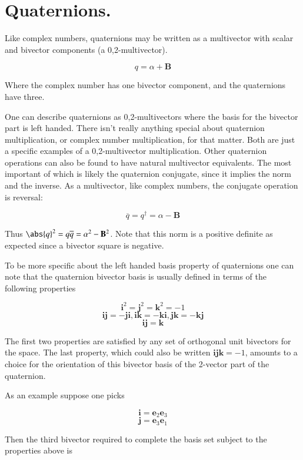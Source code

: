 \chapter{Quaternions.} %

Like complex numbers, quaternions may be written as a multivector with scalar and bivector components (a 0,2-multivector).

\[
q = \alpha + \mathbf{B}
\]

Where the complex number has one bivector component, and the quaternions have three.

One can describe quaternions as 0,2-multivectors where the basis for the bivector part is left handed.  There isn't really anything special about quaternion multiplication, or complex number multiplication, for that matter.  Both are just a specific examples of a 0,2-multivector multiplication.  Other quaternion operations can also be found to have natural multivector equivalents.  The most important of which is likely the quaternion conjugate, since it implies the norm and the inverse.  As a multivector, like complex numbers, the conjugate operation is reversal:

\[
\overline{q} = q^\dagger = \alpha - \mathbf{B}
\]

Thus $\abs{q}^2 = q\overline{q} = \alpha^2 - \mathbf{B}^2$.  Note that this norm is a positive definite as expected since a bivector square is negative.

To be more specific about the left handed basis property of quaternions one can note that the quaternion bivector basis is usually defined in terms of the following properties

\[
\mathbf{i}^2 = \mathbf{j}^2 = \mathbf{k}^2 = -1
\]
\[
\mathbf{i}\mathbf{j} = -\mathbf{j}\mathbf{i}, \mathbf{i}\mathbf{k} = -\mathbf{k}\mathbf{i}, \mathbf{j}\mathbf{k} = -\mathbf{k}\mathbf{j}
\]
\[
\mathbf{i}\mathbf{j} = \mathbf{k}
\]

The first two properties are satisfied by any set of orthogonal unit bivectors for the space.  The last property, which could also be written $\mathbf{i}\mathbf{j}\mathbf{k} = -1$, amounts to a choice for the orientation of this bivector basis of the 2-vector part of the quaternion.

As an example suppose one picks

\[
\mathbf{i} = \mathbf{e}_2\mathbf{e}_3
\]
\[
\mathbf{j} = \mathbf{e}_3\mathbf{e}_1
\]

Then the third bivector required to complete the basis set subject to the properties above is

